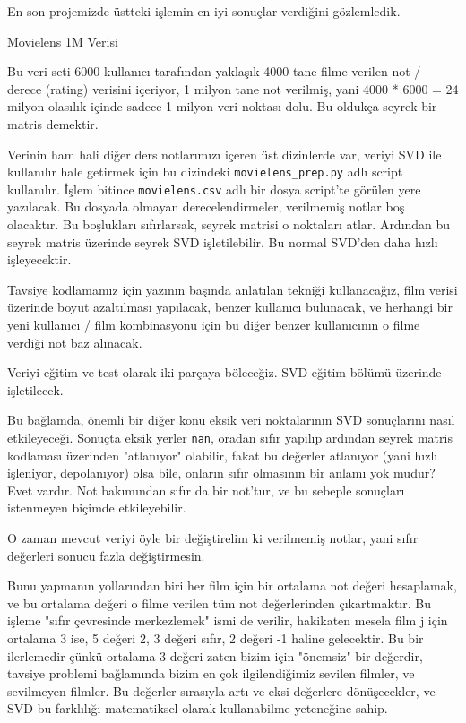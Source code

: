 \documentclass[12pt,fleqn]{article}\usepackage{../../common}
\begin{document}
En son projemizde üstteki işlemin en iyi sonuçlar verdiğini gözlemledik. 

Movielens 1M Verisi

Bu veri seti 6000 kullanıcı tarafından yaklaşık 4000 tane filme
verilen not / derece (rating) verisini içeriyor, 1 milyon tane not
verilmiş, yani 4000 * 6000 = 24 milyon olasılık içinde sadece 1 milyon
veri noktası dolu. Bu oldukça seyrek bir matris demektir.

Verinin ham hali diğer ders notlarımızı içeren üst dizinlerde var, veriyi
SVD ile kullanılır hale getirmek için bu dizindeki \verb!movielens_prep.py!
adlı script kullanılır. İşlem bitince \verb!movielens.csv! adlı bir dosya
script'te görülen yere yazılacak. Bu dosyada olmayan derecelendirmeler,
verilmemiş notlar boş olacaktır. Bu boşlukları sıfırlarsak, seyrek matrisi
o noktaları atlar. Ardından bu seyrek matris üzerinde seyrek SVD
işletilebilir. Bu normal SVD'den daha hızlı işleyecektir.

Tavsiye kodlamamız için yazının başında anlatılan tekniği kullanacağız, film
verisi üzerinde boyut azaltılması yapılacak, benzer kullanıcı bulunacak, ve
herhangi bir yeni kullanıcı / film kombinasyonu için bu diğer benzer
kullanıcının o filme verdiği not baz alınacak.

Veriyi eğitim ve test olarak iki parçaya böleceğiz. SVD eğitim bölümü
üzerinde işletilecek.

Bu bağlamda, önemli bir diğer konu eksik veri noktalarının SVD
sonuçlarını nasıl etkileyeceği. Sonuçta eksik yerler \verb!nan!,
oradan sıfır yapılıp ardından seyrek matris kodlaması üzerinden
"atlanıyor" olabilir, fakat bu değerler atlanıyor (yani hızlı
işleniyor, depolanıyor) olsa bile, onların sıfır olmasının bir anlamı
yok mudur? Evet vardır. Not bakımından sıfır da bir not'tur, ve bu
sebeple sonuçları istenmeyen biçimde etkileyebilir.

O zaman mevcut veriyi öyle bir değiştirelim ki verilmemiş notlar, yani
sıfır değerleri sonucu fazla değiştirmesin.

Bunu yapmanın yollarından biri her film için bir ortalama not değeri
hesaplamak, ve bu ortalama değeri o filme verilen tüm not
değerlerinden çıkartmaktır. Bu işleme "sıfır çevresinde merkezlemek"
ismi de verilir, hakikaten mesela film j için ortalama 3 ise, 5 değeri
2, 3 değeri sıfır, 2 değeri -1 haline gelecektir. Bu bir ilerlemedir
çünkü ortalama 3 değeri zaten bizim için "önemsiz" bir değerdir,
tavsiye problemi bağlamında bizim en çok ilgilendiğimiz sevilen
filmler, ve sevilmeyen filmler. Bu değerler sırasıyla artı ve eksi
değerlere dönüşecekler, ve SVD bu farklılığı matematiksel olarak
kullanabilme yeteneğine sahip.
\end{document}

